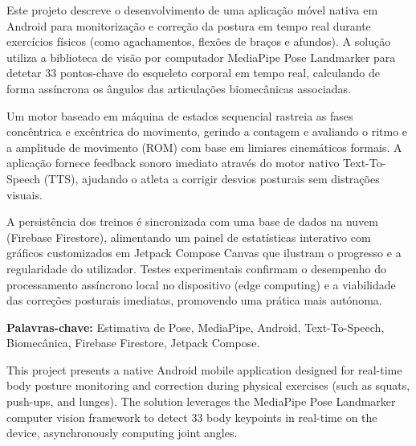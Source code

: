 

Este projeto descreve o desenvolvimento de uma aplicação móvel nativa em Android para monitorização e correção da postura em tempo real durante exercícios físicos (como agachamentos, flexões de braços e afundos). A solução utiliza a biblioteca de visão por computador MediaPipe Pose Landmarker para detetar 33 pontos-chave do esqueleto corporal em tempo real, calculando de forma assíncrona os ângulos das articulações biomecânicas associadas. 

Um motor baseado em máquina de estados sequencial rastreia as fases concêntrica e excêntrica do movimento, gerindo a contagem e avaliando o ritmo e a amplitude de movimento (ROM) com base em limiares cinemáticos formais. A aplicação fornece feedback sonoro imediato através do motor nativo Text-To-Speech (TTS), ajudando o atleta a corrigir desvios posturais sem distrações visuais.

A persistência dos treinos é sincronizada com uma base de dados na nuvem (Firebase Firestore), alimentando um painel de estatísticas interativo com gráficos customizados em Jetpack Compose Canvas que ilustram o progresso e a regularidade do utilizador. Testes experimentais confirmam o desempenho do processamento assíncrono local no dispositivo (edge computing) e a viabilidade das correções posturais imediatas, promovendo uma prática mais autónoma.

\vspace{1cm}
\noindent\textbf{Palavras-chave:} Estimativa de Pose, MediaPipe, Android, Text-To-Speech, Biomecânica, Firebase Firestore, Jetpack Compose.

\newpage


This project presents a native Android mobile application designed for real-time body posture monitoring and correction during physical exercises (such as squats, push-ups, and lunges). The solution leverages the MediaPipe Pose Landmarker computer vision framework to detect 33 body keypoints in real-time on the device, asynchronously computing joint angles.


